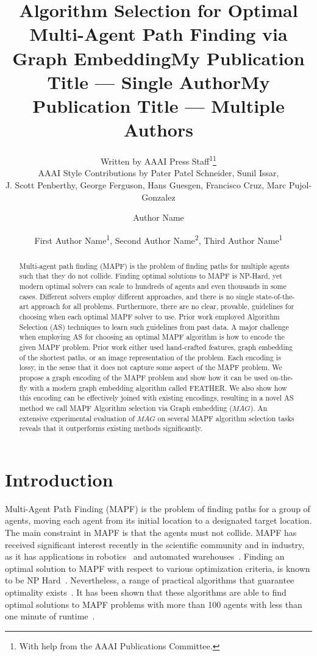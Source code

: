 \documentclass[letterpaper]{article} %
\title{Algorithm Selection for Optimal Multi-Agent Path Finding via Graph Embedding}
\author{
    Written by AAAI Press Staff\textsuperscript{\rm 1}\thanks{With help from the AAAI Publications Committee.}\\
    AAAI Style Contributions by Pater Patel Schneider,
    Sunil Issar,\\
    J. Scott Penberthy,
    George Ferguson,
    Hans Guesgen,
    Francisco Cruz\equalcontrib,
    Marc Pujol-Gonzalez\equalcontrib
}
\title{My Publication Title --- Single Author}
\author {
    Author Name
}
\title{My Publication Title --- Multiple Authors}
\author {
    First Author Name\textsuperscript{\rm 1},
    Second Author Name\textsuperscript{\rm 2},
    Third Author Name\textsuperscript{\rm 1}
}
\newcommand{\mapfgas}[1]{\ensuremath{\textit{MAG}}\xspace}
\begin{document}
\maketitle

\begin{abstract}
Multi-agent path finding (MAPF) is the problem of finding paths for multiple agents such that they do not collide.
Finding optimal solutions to MAPF is NP-Hard, yet modern optimal solvers can scale to hundreds of agents and even thousands in some cases.
Different solvers employ different approaches, and there is no single state-of-the-art approach for all problems.
Furthermore, there are no clear, provable, guidelines for choosing when each optimal MAPF solver to use.
Prior work employed Algorithm Selection (AS) techniques to learn such guidelines from past data.
A major challenge when employing AS for choosing an optimal MAPF algorithm is how to encode the given MAPF problem.
Prior work either used hand-crafted features, graph embedding of the shortest paths, or an image representation of the problem. Each encoding is lossy, in the sense that it does not capture some aspect of the MAPF problem.
We propose a graph encoding of the MAPF problem and show how it can be used on-the-fly with a modern graph embedding algorithm called FEATHER.
We also show how this encoding can be effectively joined with existing encodings, resulting in a novel AS method we call MAPF Algorithm selection via Graph embedding (\mapfgas\ ). An extensive experimental evaluation of \mapfgas\ on several MAPF algorithm selection tasks reveals that it outperforms existing methods significantly.
\end{abstract}

\section{Introduction}
\label{scn:Intro}

Multi-Agent Path Finding (MAPF) is the problem of finding paths for a group of agents, moving each agent from its initial location to a designated target location.
The main constraint in MAPF is that the agents must not collide.
MAPF has received significant interest recently in the scientific community and in industry, as it has applications in robotics~\cite{veloso2015cobots} and automated warehouses~\cite{wurman2008coordinating}.
Finding an optimal solution to MAPF with respect to various optimization criteria, is known to be NP Hard~\cite{anOptimization2010surynek,structure2013yu}.
Nevertheless, a range of practical algorithms that guarantee optimality exists~\cite{kornhauser1984pebble,surynek2009novel}.
It has been shown that these algorithms are able to find optimal solutions to MAPF problems with more than 100 agents with less than one minute of runtime~\cite{li2021pairwise}.
\end{document}
